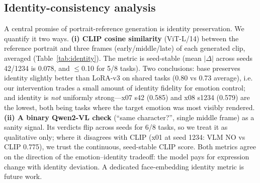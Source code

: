 \documentclass{article}
\begin{document}
\subsection{Identity-consistency analysis}
A central promise of portrait-reference generation is identity preservation. We quantify it two
ways. \textbf{(i) CLIP cosine similarity} (ViT-L/14) between the reference portrait and three
frames (early/middle/late) of each generated clip, averaged (Table~\ref{tab:identity}). The metric
is seed-stable (mean $|\Delta|$ across seeds 42/1234 is 0.078, and $\le$0.10 for 5/8 tasks). Two
conclusions: base preserves identity slightly better than LoRA-v3 on shared tasks (0.80 vs 0.73
average), i.e. our intervention trades a small amount of identity fidelity for emotion control; and
identity is \emph{not} uniformly strong---x07 s42 (0.585) and x08 s1234 (0.579) are the lowest,
both being tasks where the target emotion was most visibly rendered. \textbf{(ii) A binary
Qwen2-VL check} (``same character?'', single middle frame) as a sanity signal. Its verdicts flip
across seeds for 6/8 tasks, so we treat it as qualitative only; where it disagrees with CLIP (x01
at seed 1234: VLM NO vs CLIP 0.775), we trust the continuous, seed-stable CLIP score. Both metrics
agree on the direction of the emotion--identity tradeoff: the model pays for expression change with
identity deviation. A dedicated face-embedding identity metric is future work.
\end{document}
